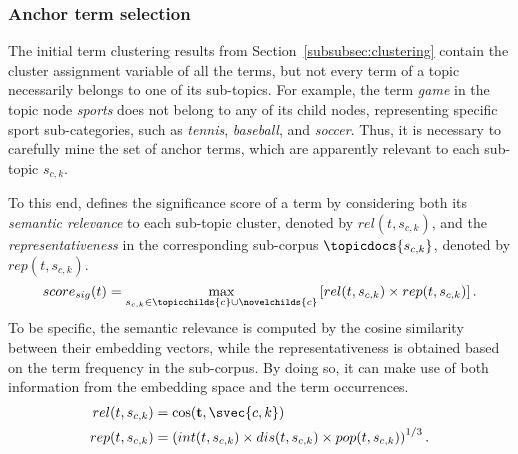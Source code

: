 \subsubsection{Anchor term selection}
\label{subsubsec:anchorterm}
The initial term clustering results from Section~\ref{subsubsec:clustering} contain the cluster assignment variable of all the terms, but not every term of a topic necessarily belongs to one of its sub-topics.
For example, the term \textit{game} in the topic node \textit{sports} does not belong to any of its child nodes, representing specific sport sub-categories, such as \textit{tennis}, \textit{baseball}, and \textit{soccer}.
Thus, it is necessary to carefully mine the set of anchor terms, which are apparently relevant to each sub-topic $s_{c,k}$.

To this end, \proposed defines the significance score of a term by considering both its \textit{semantic relevance} to each sub-topic cluster, denoted by $rel(t, s_{c,k})$, and the \textit{representativeness} in the corresponding sub-corpus $\topicdocs{s_{c,k}}$, denoted by $rep(t, s_{c,k})$.
\begin{equation}
\label{eq:sigscore}
    score_{sig}(t) = \max_{s_{c,k}\in\topicchilds{c}\cup\novelchilds{c}} \left[rel(t, s_{c,k}) \times rep(t, s_{c,k})\right].
\end{equation}
To be specific, the semantic relevance is computed by the cosine similarity between their embedding vectors, while the representativeness is obtained based on the term frequency in the sub-corpus.
By doing so, it can make use of both information from the embedding space and the term occurrences.
\begin{equation}
\begin{split}
\label{eq:relrepscore}
    rel(t, s_{c,k}) &= \cos(\mathbf{t}, \svec{c,k}) \\
    rep(t, s_{c,k}) &= \left(int(t, s_{c,k}) \times dis(t, s_{c,k}) \times pop(t, s_{c,k}) \right)^{1/3}.
\end{split}
\end{equation}

